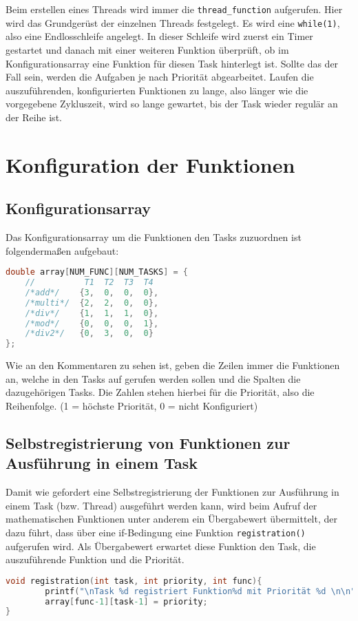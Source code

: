 Beim erstellen eines Threads wird immer die \texttt{thread_function} aufgerufen. Hier wird das Grundgerüst der einzelnen Threads festgelegt. Es wird eine \texttt{while(1)}, also eine Endlosschleife angelegt. In dieser Schleife wird zuerst ein Timer gestartet und danach mit einer weiteren Funktion überprüft, ob im Konfigurationsarray eine Funktion für diesen Task hinterlegt ist. Sollte das der Fall sein, werden die Aufgaben je nach Priorität abgearbeitet. Laufen die auszuführenden, konfigurierten Funktionen zu lange, also länger wie die vorgegebene Zykluszeit, wird so lange gewartet, bis der Task wieder regulär an der Reihe ist. 

\section{Konfiguration der Funktionen}
\subsection{Konfigurationsarray}

Das Konfigurationsarray um die Funktionen den Tasks zuzuordnen ist folgendermaßen aufgebaut:
\begin{lstlisting}[language=C]
double array[NUM_FUNC][NUM_TASKS] = {
    //          T1  T2  T3  T4
    /*add*/    {3,  0,  0,  0},
    /*multi*/  {2,  2,  0,  0},
    /*div*/    {1,  1,  1,  0},
    /*mod*/    {0,  0,  0,  1},
    /*div2*/   {0,  3,  0,  0}
};
\end{lstlisting}

Wie an den Kommentaren zu sehen ist, geben die Zeilen immer die Funktionen an, welche in den Tasks auf gerufen werden sollen und die Spalten die dazugehörigen Tasks. Die Zahlen stehen hierbei für die Priorität, also die Reihenfolge. (1 = höchste Priorität, 0 = nicht Konfiguriert) 

\subsection{Selbstregistrierung von Funktionen zur Ausführung in einem Task}
Damit wie gefordert eine Selbstregistrierung der Funktionen zur Ausführung in einem Task (bzw. Thread) ausgeführt werden kann, wird beim Aufruf der mathematischen Funktionen unter anderem ein Übergabewert übermittelt, der dazu führt, dass über eine if-Bedingung eine Funktion \texttt{registration()} aufgerufen wird. Als Übergabewert erwartet diese Funktion den Task, die auszuführende Funktion und die Priorität. 
\begin{lstlisting}[language=C]
void registration(int task, int priority, int func){
        printf("\nTask %d registriert Funktion%d mit Priorität %d \n\n", task, func, priority);
        array[func-1][task-1] = priority;
}
\end{lstlisting}

